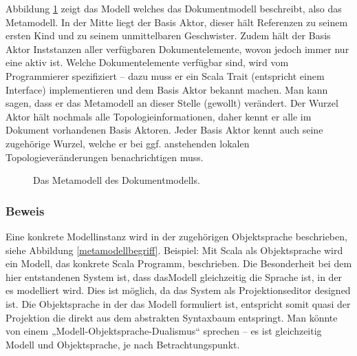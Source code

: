 Abbildung \ref{metamodell} zeigt das Modell welches das Dokumentmodell beschreibt, also das Metamodell. In der Mitte liegt der Basis Aktor, dieser hält Referenzen zu seinem ersten Kind und zu seinem unmittelbaren Geschwister. Zudem hält der Basis Aktor Inststanzen aller verfügbaren Dokumentelemente, wovon jedoch immer nur eine aktiv ist. Welche Dokumentelemente verfügbar sind, wird vom Programmierer spezifiziert -- dazu muss er ein Scala Trait (entspricht einem Interface) implementieren und dem Basis Aktor bekannt machen. Man kann sagen, dass er das Metamodell an dieser Stelle (gewollt) verändert. Der Wurzel Aktor hält nochmals alle Topologieinformationen, daher kennt er alle im Dokument vorhandenen Basis Aktoren. Jeder Basis Aktor kennt auch seine zugehörige Wurzel, welche er bei ggf. anstehenden lokalen Topologieveränderungen benachrichtigen muss.

 
\begin{figure}[h!]
\centering
\advance\leftskip-2.5cm
\caption[Metamodell des Dokumentmodells]{ Das Metamodell des Dokumentmodells. }\label{metamodell}
\end{figure}
 
\subsubsection{Beweis}\label{}

 
Eine konkrete Modellinstanz wird in der zugehörigen Objektsprache beschrieben, siehe Abbildung \ref{metamodellbegriff}. Beispiel: Mit Scala als Objektsprache wird ein Modell, das konkrete Scala Programm, beschrieben. Die Besonderheit bei dem hier entstandenen System ist, dass dasModell gleichzeitig die Sprache ist, in der es modelliert wird. Dies ist möglich, da das System als Projektionseditor designed ist. Die Objektsprache in der das Modell formuliert ist, entspricht somit quasi der Projektion die direkt aus dem abstrakten Syntaxbaum entspringt. Man könnte von einem „Modell-Objektsprache-Dualismus“ sprechen -- es ist gleichzeitig Modell und Objektsprache, je nach Betrachtungspunkt.

